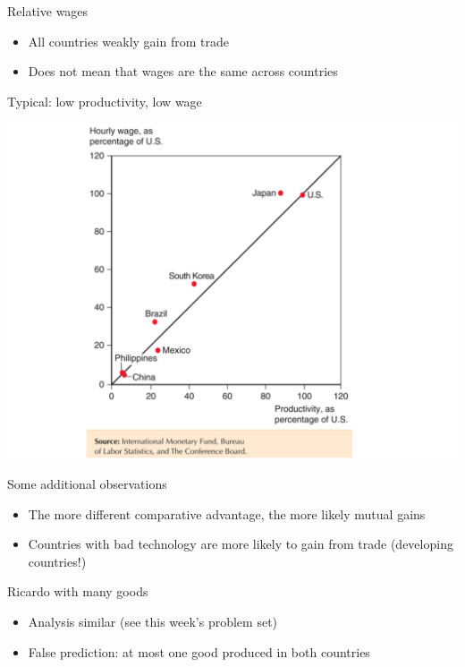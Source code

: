 \documentclass[ignorenonframetext,]{beamer}
\begin{document}
\begin{frame}{Relative wages}

    \begin{itemize}
        \item All countries weakly gain from trade
        \item Does not mean that wages are the same across countries 
    \end{itemize}

\end{frame}

\begin{frame}{Typical: low productivity, low wage}

    \includegraphics[scale=0.25]{low_prod_low_wage.png}

\end{frame}

\begin{frame}{Some additional observations}

    \begin{itemize}
        \item The more different comparative advantage, the more likely mutual gains
        \item Countries with bad technology are more likely to gain from trade (developing countries!)
    \end{itemize}

\end{frame}

\begin{frame}{Ricardo with many goods}

    \begin{itemize}
        \item Analysis similar (see this week's problem set)
        \item False prediction: at most one good produced in both countries
    \end{itemize}

\end{frame}
\end{document}

